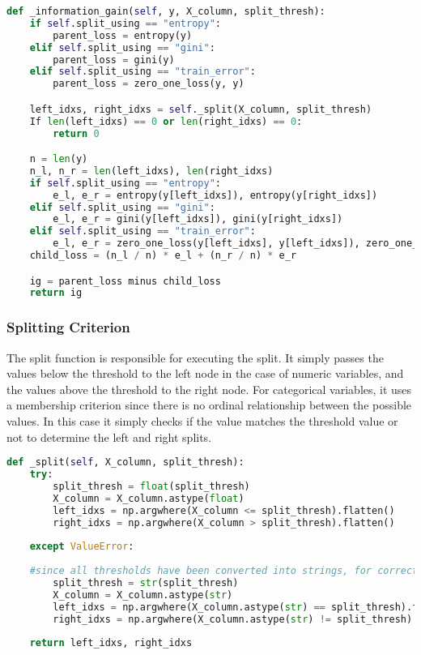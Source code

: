 \documentclass{article}
\begin{document}
\begin{lstlisting}[language=Python, caption=Splitting and Information Gain Calculation]
def _information_gain(self, y, X_column, split_thresh):
    if self.split_using == "entropy":
        parent_loss = entropy(y)
    elif self.split_using == "gini":
        parent_loss = gini(y)
    elif self.split_using == "train_error":
        parent_loss = zero_one_loss(y, y)

    left_idxs, right_idxs = self._split(X_column, split_thresh)
    If len(left_idxs) == 0 or len(right_idxs) == 0:
        return 0

    n = len(y)
    n_l, n_r = len(left_idxs), len(right_idxs)
    if self.split_using == "entropy":
        e_l, e_r = entropy(y[left_idxs]), entropy(y[right_idxs])
    elif self.split_using == "gini":
        e_l, e_r = gini(y[left_idxs]), gini(y[right_idxs])
    elif self.split_using == "train_error":
        e_l, e_r = zero_one_loss(y[left_idxs], y[left_idxs]), zero_one_loss(y[right_idxs], y[right_idxs])
    child_loss = (n_l / n) * e_l + (n_r / n) * e_r

    ig = parent_loss minus child_loss
    return ig
\end{lstlisting}

\subsubsection{Splitting Criterion}
The split function is responsible for executing the split. It simply passes the values below the threshold to the left node in the case of numeric variables, and the values above the threshold to the right node. For categorical variables, it uses a membership criterion since there is no ordinal relationship between the possible values. In this case it simply checks if the value matches the threshold value or not to determine the left and right splits.

\begin{lstlisting}[language=Python, caption=Splitting for categorical and numeric variables]
def _split(self, X_column, split_thresh):
    try:
        split_thresh = float(split_thresh)
        X_column = X_column.astype(float)
        left_idxs = np.argwhere(X_column <= split_thresh).flatten()
        right_idxs = np.argwhere(X_column > split_thresh).flatten()
    
    except ValueError:
        
    #since all thresholds have been converted into strings, for correct handling of nulls, X_column will need to be converted into strings too
        split_thresh = str(split_thresh)
        X_column = X_column.astype(str)
        left_idxs = np.argwhere(X_column.astype(str) == split_thresh).flatten()
        right_idxs = np.argwhere(X_column.astype(str) != split_thresh).flatten()
    
    return left_idxs, right_idxs
\end{lstlisting}
\end{document}
